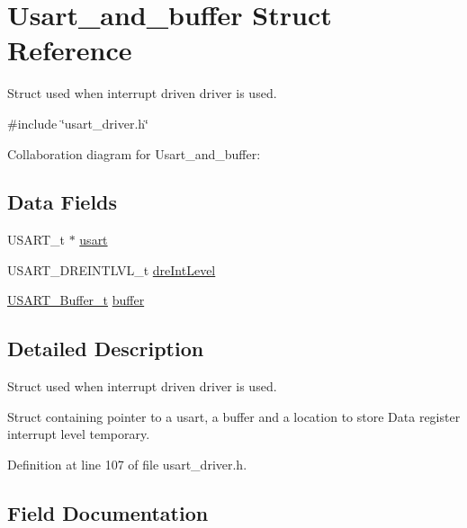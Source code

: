 \hypertarget{struct_usart__and__buffer}{}\section{Usart\+\_\+and\+\_\+buffer Struct Reference}
\label{struct_usart__and__buffer}


Struct used when interrupt driven driver is used.  




{\ttfamily \#include \char`\"{}usart\+\_\+driver.\+h\char`\"{}}



Collaboration diagram for Usart\+\_\+and\+\_\+buffer\+:
\subsection*{Data Fields}
\begin{DoxyCompactItemize}
\item 
U\+S\+A\+R\+T\+\_\+t $\ast$ \hyperlink{struct_usart__and__buffer_a5a819ee5e46999aaae5cb6813014ec08}{usart}
\item 
U\+S\+A\+R\+T\+\_\+\+D\+R\+E\+I\+N\+T\+L\+V\+L\+\_\+t \hyperlink{struct_usart__and__buffer_ad854f355ca0804e81a03cd57c659da59}{dre\+Int\+Level}
\item 
\hyperlink{usart__driver_8h_af27d135e807dcd1846b6f175997c5f45}{U\+S\+A\+R\+T\+\_\+\+Buffer\+\_\+t} \hyperlink{struct_usart__and__buffer_adb062fac585f93e6e48f3d5980e30f22}{buffer}
\end{DoxyCompactItemize}


\subsection{Detailed Description}
Struct used when interrupt driven driver is used. 

Struct containing pointer to a usart, a buffer and a location to store Data register interrupt level temporary. 

Definition at line 107 of file usart\+\_\+driver.\+h.



\subsection{Field Documentation}
\hypertarget{struct_usart__and__buffer_adb062fac585f93e6e48f3d5980e30f22}{}\label{struct_usart__and__buffer_adb062fac585f93e6e48f3d5980e30f22} 
